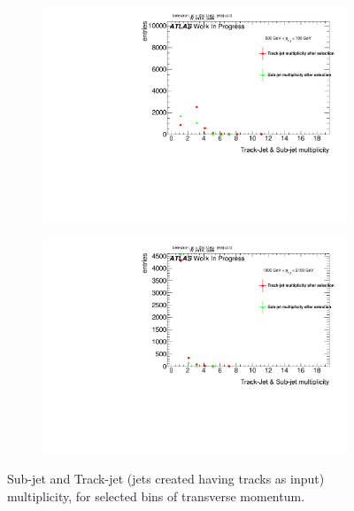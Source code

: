\begin{figure}
    \centering
    \begin{subfigure}[b]{0.45\textwidth}
	\centering
        \includegraphics[width=\textwidth]{jet_part/mta/13cfrt_h_SubJet_aftersel_ptJ03TAmult.pdf}
 
    \end{subfigure}
    \begin{subfigure}[b]{0.45\textwidth}
	\centering
        \includegraphics[width=\textwidth]{jet_part/mta/13cfrt_h_SubJet_aftersel_ptJ10TAmult.pdf}
   
    \end{subfigure}
    \caption{Sub-jet and Track-jet (jets created having tracks as input) multiplicity, for selected bins of transverse momentum.} 
    \label{fig:multi}
\end{figure}


